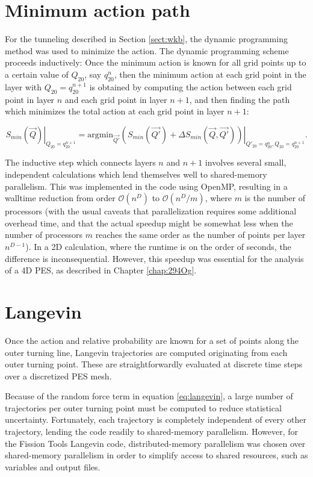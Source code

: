 \section{Minimum action path}
For the tunneling described in Section \ref{sect:wkb}, the dynamic programming method \cite{Baran1981} was used to minimize the action. The dynamic programming scheme proceeds inductively: Once the minimum action is known for all grid points up to a certain value of $Q_{20}$, say $q_{20}^n$, then the minimum action at each grid point in the layer with $Q_{20}=q_{20}^{n+1}$ is obtained by computing the action between each grid point in layer $n$ and each grid point in layer $n+1$, and then finding the path which minimizes the total action at each grid point in layer $n+1$:

\begin{equation}
\left.S_{min}(\vec{Q})\right|_{Q_{20}=q_{20}^{n+1}} = \mathrm{argmin}_{\vec{Q'}}\left.\left(S_{min}(\vec{Q'}) + \Delta S_{min}(\vec{Q},\vec{Q'})\right)\right|_{Q'_{20}=q_{20}^{n}, Q_{20}=q_{20}^{n+1}}.
\end{equation}

The inductive step which connects layers $n$ and $n+1$ involves several small, independent calculations which lend themselves well to shared-memory parallelism. This was implemented in the code using OpenMP, resulting in a walltime reduction from order $\mathcal{O}(n^D)$ to $\mathcal{O}(n^D/m)$, where $m$ is the number of processors (with the usual caveats that parallelization requires some additional overhead time, and that the actual speedup might be somewhat less when the number of processors $m$ reaches the same order as the number of points per layer $n^{D-1}$). In a 2D calculation, where the runtime is on the order of seconds, the difference is inconsequential. However, this speedup was essential for the analysis of a 4D PES, as described in Chapter \ref{chap:294Og}.


\section{Langevin}
Once the action and relative probability are known for a set of points along the outer turning line, Langevin trajectories are computed originating from each outer turning point. These are straightforwardly evaluated at discrete time steps over a discretized PES mesh.

Because of the random force term in equation \ref{eq:langevin}, a large number of trajectories per outer turning point must be computed to reduce statistical uncertainty. Fortunately, each trajectory is completely independent of every other trajectory, lending the code readily to shared-memory parallelism. However, for the Fission Tools Langevin code, distributed-memory parallelism was chosen over shared-memory parallelism in order to simplify access to shared resources, such as variables and output files.